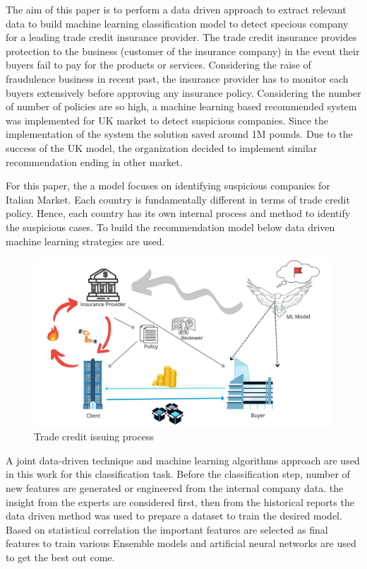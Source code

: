 

The aim of this paper is to perform a data driven approach to extract relevant data to build machine learning classification model to detect specious company for a leading trade credit insurance provider. The trade credit insurance provides protection to the business (customer of the insurance company) in the event their buyers fail to pay for the products or services. Considering the raise of fraudulence business in recent past, the insurance provider has to monitor each buyers extensively before approving any insurance policy. Considering the number of number of policies are so high, a machine learning based recommended system was implemented for UK market to detect suspicious companies. Since the implementation of the system the solution saved around 1M pounds. Due to the success of the UK model, the organization decided to implement similar recommendation ending in other market.

For this paper, the a model focuses on identifying suspicious companies for Italian Market. Each country is fundamentally different in terms of trade credit policy. Hence, each country has its own internal process and method to identify the suspicious cases. To build the recommendation model below data driven machine learning strategies are used.

\begin{figure}[htp]
    \centering
    \includegraphics[width=\linewidth]{figures/monitor_buyers.jpg}
    \caption{Trade credit issuing process}
    \label{fig:trade_credit}
\end{figure}

A joint data-driven technique and machine learning algorithms approach are used in this work for this classification task. Before the classification step, number of new features are generated or engineered from the internal company data. the insight from the experts are considered first, then from the historical reports the data driven method was used to prepare a dataset to train the desired model. Based on statistical correlation the important features are selected as final features to train various Ensemble models and artificial neural networks are used to get the best out come. 

